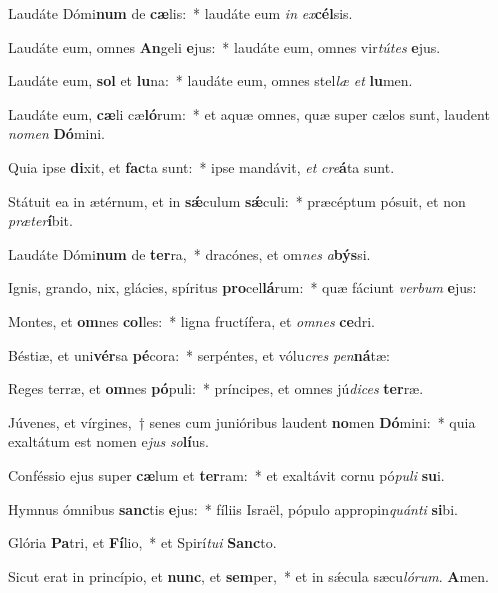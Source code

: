 \item Laudáte Dómi\textbf{num} de \textbf{cæ}lis:~* laudáte eum \textit{in} \textit{ex}\textbf{cél}sis.

\item Laudáte eum, omnes \textbf{An}geli \textbf{e}jus:~* laudáte eum, omnes vir\textit{tútes} \textbf{e}jus.

\item Laudáte eum, \textbf{sol} et \textbf{lu}na:~* laudáte eum, omnes stel\textit{læ} \textit{et} \textbf{lu}men.

\item Laudáte eum, \textbf{cæ}li cæ\textbf{ló}rum:~* et aquæ omnes, quæ super cælos sunt, laudent \textit{nomen} \textbf{Dó}mini.

\item Quia ipse \textbf{di}xit, et \textbf{fac}ta sunt:~* ipse mandávit, \textit{et} \textit{cre}\textbf{á}ta sunt.

\item Státuit ea in ætérnum, et in \textbf{sǽ}culum \textbf{sǽ}culi:~* præcéptum pósuit, et non \textit{præter}\textbf{í}bit.

\item Laudáte Dómi\textbf{num} de \textbf{ter}ra,~* dracónes, et om\textit{nes} \textit{a}\textbf{býs}si.

\item Ignis, grando, nix, glácies, spíritus \textbf{pro}cel\textbf{lá}rum:~* quæ fáciunt \textit{verbum} \textbf{e}jus:

\item Montes, et \textbf{om}nes \textbf{col}les:~* ligna fructífera, et \textit{omnes} \textbf{ce}dri.

\item Béstiæ, et uni\textbf{vér}sa \textbf{pé}cora:~* serpéntes, et vólu\textit{cres} \textit{pen}\textbf{ná}tæ:

\item Reges terræ, et \textbf{om}nes \textbf{pó}puli:~* príncipes, et omnes jú\textit{dices} \textbf{ter}ræ.

\item Júvenes, et vírgines,~† senes cum junióribus laudent \textbf{no}men \textbf{Dó}mini:~* quia exaltátum est nomen e\textit{jus} \textit{so}\textbf{lí}us.

\item Conféssio ejus super \textbf{cæ}lum et \textbf{ter}ram:~* et exaltávit cornu pó\textit{puli} \textbf{su}i.

\item Hymnus ómnibus \textbf{sanc}tis \textbf{e}jus:~* fíliis Israël, pópulo appropin\textit{quánti} \textbf{si}bi.

\item Glória \textbf{Pa}tri, et \textbf{Fí}lio,~* et Spirí\textit{tui} \textbf{Sanc}to.

\item Sicut erat in princípio, et \textbf{nunc}, et \textbf{sem}per,~* et in sǽcula sæcu\textit{lórum}. \textbf{A}men.

